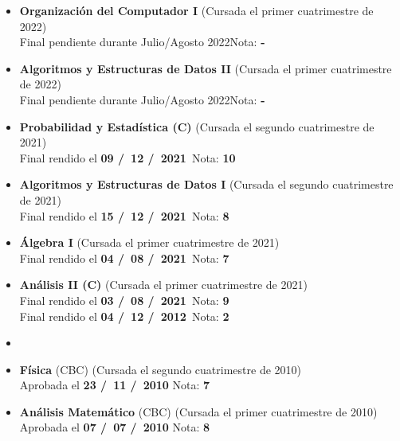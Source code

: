   \begin{itemize}[leftmargin=0.8cm]

    \item{\textbf{Organización del Computador I} (Cursada el primer cuatrimestre de 2022)\\
    Final pendiente durante Julio/Agosto 2022\hfill Nota: \textbf{-}}

    \item{\textbf{Algoritmos y Estructuras de Datos II} (Cursada el primer cuatrimestre de 2022)\\
    Final pendiente durante Julio/Agosto 2022\hfill Nota: \textbf{-}}

    \item{\textbf{Probabilidad y Estadística (C)} (Cursada el segundo cuatrimestre de 2021)\\
    Final rendido el \textbf{09 \slash \ 12 \slash \ 2021}\ \hfill Nota: \textbf{10}}

    \item{\textbf{Algoritmos y Estructuras de Datos I} (Cursada el segundo cuatrimestre de 2021)\\
    Final rendido el \textbf{15 \slash \ 12 \slash \ 2021}\ \hfill Nota: \textbf{8}}

    \item{\textbf{Álgebra I} (Cursada el primer cuatrimestre de 2021)\\
    Final rendido el \textbf{04 \slash \ 08 \slash \ 2021}\ \hfill Nota: \textbf{7}}

    \item{\textbf{Análisis II (C)} (Cursada el primer cuatrimestre de 2021)\\
    Final rendido el \textbf{03 \slash \ 08 \slash \ 2021}\ \hfill Nota: \textbf{9}}\\
    Final rendido el \textbf{04 \slash \ 12 \slash \ 2012}\ \hfill Nota: \textbf{2}

    \item[] %

    \item{\textbf{Física} (CBC) (Cursada el segundo cuatrimestre de 2010)\\
    Aprobada el \textbf{23 \slash \ 11 \slash \ 2010} \hfill Nota: \textbf{7}}

    \item{\textbf{Análisis Matemático} (CBC) (Cursada el primer cuatrimestre de 2010)\\
    Aprobada el \textbf{07 \slash \ 07 \slash \ 2010} \hfill Nota: \textbf{8}}


\end{itemize}
